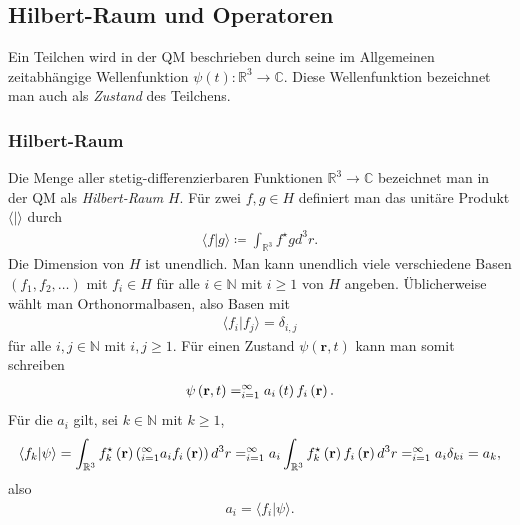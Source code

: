 \documentclass{book}
\let\sum\relax
\DeclareMathOperator*{\sum}{\raisebox{-3.5pt}{\scalebox{2}{\rotatebox{1}{{\bask Σ}}}}}
\begin{document}
\subsection{Hilbert-Raum und Operatoren}
\label{sec:hilbertraum_und_operatoren}

Ein Teilchen wird in der QM beschrieben durch seine im Allgemeinen zeitabhängige Wellenfunktion $\psi\left(t\right):\mathbb{R}^3\to\mathbb{C}$. Diese Wellenfunktion bezeichnet man auch als \textit{Zustand} des Teilchens.

\subsubsection{Hilbert-Raum}
\label{sec:hilbertraum}

Die Menge aller stetig-differenzierbaren Funktionen $\mathbb{R}^3\to\mathbb{C}$ bezeichnet man in der QM als \textit{Hilbert-Raum} $H$. Für zwei $f, g\in H$ definiert man das unitäre Produkt $\langle|\rangle$ durch
%
\begin{eqnarray}
\langle f|g\rangle \coloneqq \int_{\mathbb{R}^3}f^\star gd^3r.
\end{eqnarray}
%
Die Dimension von $H$ ist unendlich. Man kann unendlich viele verschiedene Basen $\left(f_1, f_2, \dotsc\right)$ mit $f_i\in H$ für alle $i\in\mathbb{N}$ mit $i\geq 1$ von $H$ angeben. Üblicherweise wählt man Orthonormalbasen, also Basen mit
%
\begin{eqnarray}
\langle f_i|f_j\rangle = \delta_{i, j}
\end{eqnarray}
%
für alle $i, j\in\mathbb{N}$ mit $i, j\geq 1$. Für einen Zustand $\psi\left(\mathbf{r}, t\right)$ kann man somit schreiben
%
\begin{eqnarray}
\psi\left(\mathbf{r}, t\right) = \sum_{i = 1}^{\infty}a_i\left(t\right)f_i\left(\mathbf{r}\right).
\end{eqnarray}
%
Für die $a_i$ gilt, sei $k\in\mathbb{N}$ mit $k\geq 1$, 
%
\begin{eqnarray}
\langle f_k|\psi\rangle = \int_{\mathbb{R}^3}f_k^\star\left(\mathbf{r}\right)\left(\sum_{i = 1}^{\infty}a_if_i\left(\mathbf{r}\right)\right)d^3r = \sum_{i = 1}^{\infty}a_i\int_{\mathbb{R}^3}f_k^\star\left(\mathbf{r}\right)f_i\left(\mathbf{r}\right)d^3r = \sum_{i = 1}^{\infty}a_i\delta_{ki} = a_k, 
\end{eqnarray}
%
also
%
\begin{eqnarray}
a_i = \langle f_i|\psi\rangle.\label{eq:formel_ent_koeff}
\end{eqnarray}
\end{document}
